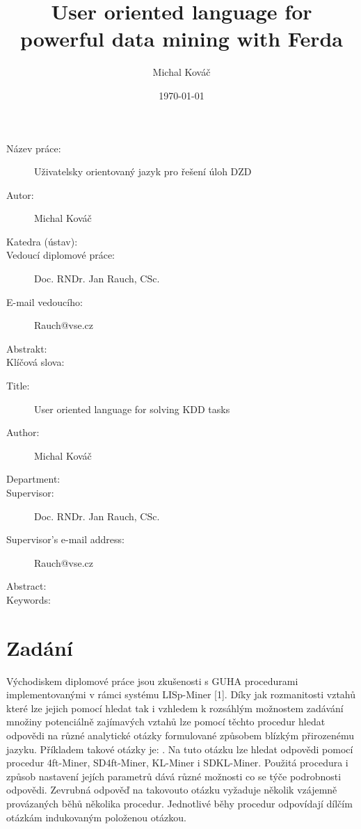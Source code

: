 \documentclass[a4paper,12pt]{book}
\author{Michal Kováč}
\title{User oriented language for powerful data mining with Ferda}
\date{\today}
\begin{document}
\maketitle

\begin{description}
 \item [Název práce:] Uživatelsky orientovaný jazyk pro řešení úloh DZD
 \item [Autor:] Michal Kováč
 \item [Katedra (ústav):]
 \item [Vedoucí diplomové práce:] Doc. RNDr. Jan Rauch, CSc.
 \item [E-mail vedoucího:] Rauch@vse.cz
 \item [Abstrakt:]
 \item [Klíčová slova:]
\end{description}

\medskip

\begin{description}
 \item [Title:] User oriented language for solving KDD tasks
 \item [Author:] Michal Kováč
 \item [Department:]
 \item [Supervisor:] Doc. RNDr. Jan Rauch, CSc.
 \item [Supervisor's e-mail address:] Rauch@vse.cz
 \item [Abstract:]
 \item [Keywords:]
\end{description}
\newpage
\section*{Zadání}
Východiskem diplomové práce jsou zkušenosti s GUHA procedurami implementovanými v rámci systému LISp-Miner [1]. Díky jak rozmanitosti vztahů které lze jejich pomocí hledat tak i vzhledem k rozsáhlým možnostem zadávání množiny potenciálně zajímavých vztahů lze pomocí těchto procedur hledat odpovědi na různé analytické otázky formulované způsobem blízkým přirozenému jazyku. Příkladem takové otázky je: . Na tuto otázku lze hledat odpovědi pomocí procedur 4ft-Miner, SD4ft-Miner, KL-Miner i SDKL-Miner. Použitá procedura i způsob nastavení jejích parametrů dává různé možnosti co se týče podrobnosti odpovědi. Zevrubná odpověď na takovouto otázku vyžaduje několik vzájemně provázaných běhů několika procedur. Jednotlivé běhy procedur odpovídají dílčím otázkám indukovaným položenou otázkou.
\end{document}
